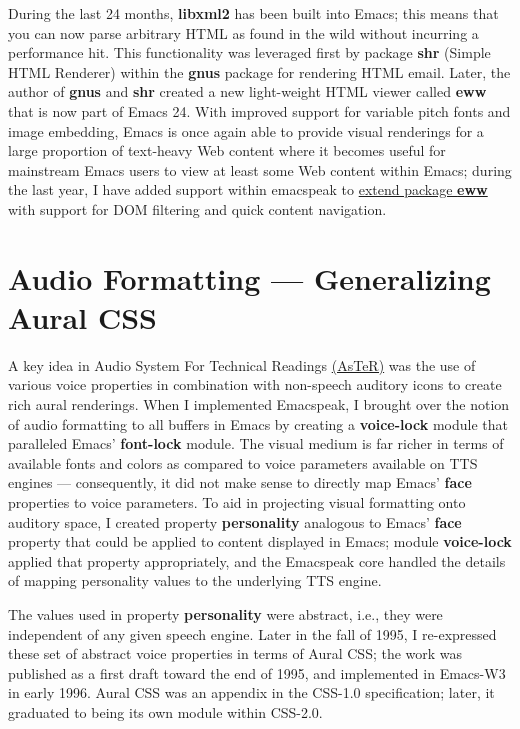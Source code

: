\documentclass[11pt]{article}
\begin{document}
During the last 24 months, \textbf{libxml2} has been built into Emacs;
this means that you can now parse arbitrary HTML as found in the
wild without incurring a performance hit. This functionality was
leveraged first by package \textbf{shr} (Simple HTML Renderer) within
the \textbf{gnus} package for rendering HTML email. Later, the author of
\textbf{gnus} and \textbf{shr} created a new light-weight HTML viewer called
\textbf{eww} that is now part of Emacs 24. With improved support for
variable pitch fonts and image embedding, Emacs is once again
able to provide visual renderings for a large proportion of
text-heavy Web content where it becomes useful for mainstream
Emacs users to view at least some Web content within Emacs;
during the last year, I have added support within emacspeak to
\href{http://emacspeak.blogspot.com/2014/05/emacspeak-eww-updates-for-complete.html}{extend package \textbf{eww}} with support for DOM filtering and quick
content navigation.

\section{Audio Formatting —  Generalizing Aural CSS}
\label{sec:orgf259491}


A key idea in Audio System For Technical Readings \href{http://www.cs.cornell.edu/home/raman/aster/aster-toplevel.html}{(AsTeR)} was the
use of various voice properties in combination with non-speech
auditory icons to create rich aural renderings. When I
implemented Emacspeak, I brought over the notion of audio
formatting to all buffers in Emacs by creating a \textbf{voice-lock}
module that paralleled Emacs' \textbf{font-lock} module. The visual
medium is far richer in terms of available fonts and colors as
compared to voice parameters available on TTS engines —
consequently, it did not make sense to directly map Emacs' \textbf{face}
properties to voice parameters. To aid in projecting visual
formatting onto auditory space, I created property \textbf{personality}
analogous to Emacs' \textbf{face} property that could be applied to
content displayed in Emacs; module \textbf{voice-lock} applied that
property appropriately, and the Emacspeak core handled the
details of mapping personality values to the underlying TTS
engine.

The values used in property \textbf{personality} were abstract, i.e.,
they were independent of any given speech engine. Later in the
fall of 1995, I re-expressed these set of abstract voice
properties in terms of Aural CSS; the work was published as a
first draft toward the end of 1995, and implemented in Emacs-W3
in early 1996. Aural CSS was an appendix in the CSS-1.0
specification; later, it graduated to being its own module within
CSS-2.0.
\end{document}
